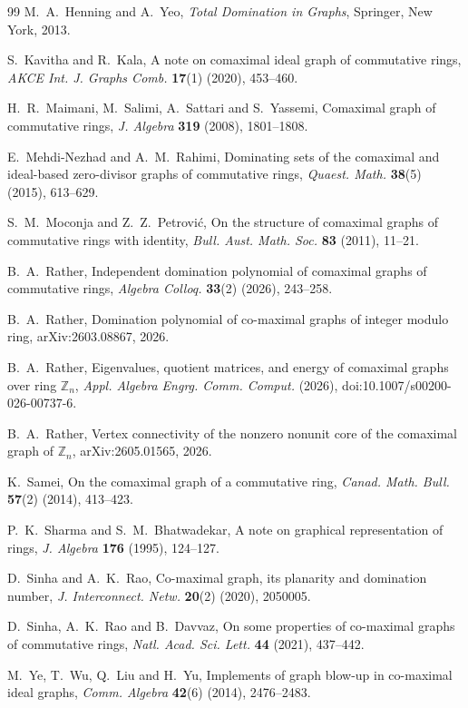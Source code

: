 \documentclass[11pt]{amsart}
\theoremstyle{definition}
\theoremstyle{remark}
\newcommand{\Z}{\mathbb{Z}}
\begin{document}
\begin{thebibliography}{99}
 M.~A.~Henning and A.~Yeo, \emph{Total Domination in Graphs}, Springer, New York,
2013.

 S.~Kavitha and R.~Kala, A note on comaximal ideal graph of commutative rings,
\emph{AKCE Int. J. Graphs Comb.} \textbf{17}(1) (2020), 453--460.

 H.~R.~Maimani, M.~Salimi, A.~Sattari and S.~Yassemi, Comaximal graph of
commutative rings, \emph{J. Algebra} \textbf{319} (2008), 1801--1808.

 E.~Mehdi-Nezhad and A.~M.~Rahimi, Dominating sets of the comaximal and ideal-based
zero-divisor graphs of commutative rings, \emph{Quaest. Math.} \textbf{38}(5) (2015), 613--629.

 S.~M.~Moconja and Z.~Z.~Petrovi\'c, On the structure of comaximal graphs of
commutative rings with identity, \emph{Bull. Aust. Math. Soc.} \textbf{83} (2011), 11--21.

 B.~A.~Rather, Independent domination polynomial of comaximal graphs of commutative
rings, \emph{Algebra Colloq.} \textbf{33}(2) (2026), 243--258.

 B.~A.~Rather, Domination polynomial of co-maximal graphs of integer modulo ring,
arXiv:2603.08867, 2026.

 B.~A.~Rather, Eigenvalues, quotient matrices, and energy of comaximal graphs over
ring $\Z_n$, \emph{Appl. Algebra Engrg. Comm. Comput.} (2026), doi:10.1007/s00200-026-00737-6.

 B.~A.~Rather, Vertex connectivity of the nonzero nonunit core of the comaximal graph
of $\Z_n$, arXiv:2605.01565, 2026.

 K.~Samei, On the comaximal graph of a commutative ring, \emph{Canad. Math. Bull.}
\textbf{57}(2) (2014), 413--423.

 P.~K.~Sharma and S.~M.~Bhatwadekar, A note on graphical representation of rings,
\emph{J. Algebra} \textbf{176} (1995), 124--127.

 D.~Sinha and A.~K.~Rao, Co-maximal graph, its planarity and domination number,
\emph{J. Interconnect. Netw.} \textbf{20}(2) (2020), 2050005.

 D.~Sinha, A.~K.~Rao and B.~Davvaz, On some properties of co-maximal graphs of
commutative rings, \emph{Natl. Acad. Sci. Lett.} \textbf{44} (2021), 437--442.

 M.~Ye, T.~Wu, Q.~Liu and H.~Yu, Implements of graph blow-up in co-maximal ideal
graphs, \emph{Comm. Algebra} \textbf{42}(6) (2014), 2476--2483.

\end{thebibliography}
\end{document}
